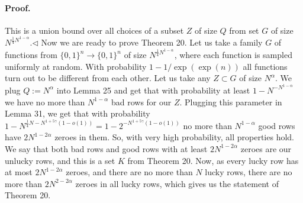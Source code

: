 \paragraph{Proof.} This is a union bound over all choices of a subset $Z$ of size $Q$ from set $G$ of size $N^{\frac14N^{1-\alpha}}$.\hfill$\triangleleft$
Now we are ready to prove Theorem 20.
Let us take a family $G$ of functions from $\{0,1\}^n\to\{0,1\}^n$ of size $N^{\frac14N^{1-\alpha}}$, where each function is sampled uniformly at random. With probability $1-1/\exp(\exp(n))$ all functions turn out to be different from each other.
Let us take any $Z\subset G$ of size $N^\alpha$. We plug $Q:=N^\alpha$ into Lemma 25 and get that with probability at least $1-N^{-N^{1-\alpha}}$ we have no more than $N^{1-\alpha}$ bad rows for our $Z$.
Plugging this parameter in Lemma 31, we get that with probability $1-N^{\frac14N-N^{1+5\gamma}(1-o(1))}=1-2^{-N^{1+5\gamma}(1-o(1))}$ no more than $N^{1-\alpha}$ good rows have $2N^{1-2\alpha}$ zeroes in them.
So, with very high probability, all properties hold. We say that both bad rows and good rows with at least $2N^{1-2\alpha}$ zeroes are our unlucky rows, and this is a set $K$ from Theorem 20.
Now, as every lucky row has at most $2N^{1-2\alpha}$ zeroes, and there are no more than $N$ lucky rows, there are no more than $2N^{2-2\alpha}$ zeroes in all lucky rows, which gives us the statement of Theorem 20.
